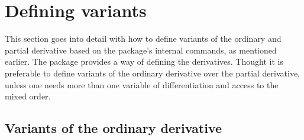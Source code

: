 \documentclass[final,british,10pt]{scrartcl}
\theoremstyle{remark}
\begin{document}
	
	
	
	
	
	\clearpage
	\section{Defining variants} \label{sec:createvariants}
	This section goes into detail with how to define variants of the ordinary and partial derivative based on the package's internal commands, as mentioned earlier. The \mypackage{} package provides a  way of defining the derivatives. Thought it is preferable to define variants of the ordinary derivative over the partial derivative, unless one needs more than one variable of differentiation and access to the mixed order.
	
	\subsection{Variants of the ordinary derivative} \label{ssec:CreateOdvVariant}
	
\end{document}
